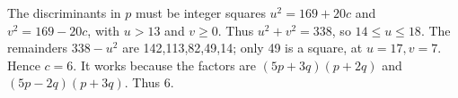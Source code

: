 The discriminants in $p$ must be integer squares $u^2=169+20c$ and $v^2=169-20c$, with $u>13$ and $v\ge0$. Thus $u^2+v^2=338$, so $14\le u\le18$. The remainders $338-u^2$ are 142,113,82,49,14; only 49 is a square, at $u=17,v=7$. Hence $c=6$. It works because the factors are $(5p+3q)(p+2q)$ and $(5p-2q)(p+3q)$. Thus $\boxed6$.
